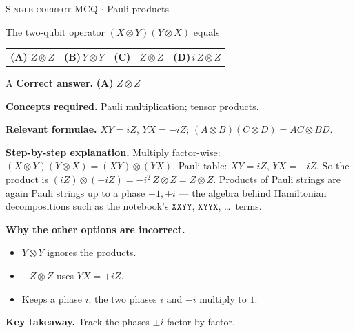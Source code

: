 \documentclass[11pt,a4paper]{article}
\newcommand{\optlabel}[1]{\textbf{(#1)}}
\newcommand{\correctlabel}[1]{\textcolor{okgreen}{\textbf{(#1)}\,\ding{51}}}
\newenvironment{qitem}[1]{\begin{list}{}{\setlength{\leftmargin}{3.3em}\setlength{\labelwidth}{3.1em}%
  \setlength{\labelsep}{0.2em}\setlength{\topsep}{3pt}\setlength{\parsep}{3pt}}\item[\textbf{Q.#1}\hfill]}{\end{list}}
\newcommand{\qsep}{\par\vspace{2pt}{\color{black!15}\hrule}\vspace{4pt}}
\newcommand{\qmeta}[2]{{\footnotesize\color{black!60}\textsc{#1} \;$\cdot$\; #2}\par}
\begin{document}
\begin{qitem}{22}
\qmeta{Single-correct MCQ}{Pauli products}
The two-qubit operator $(X\otimes Y)(Y\otimes X)$ equals
\par\smallskip\noindent\begin{tabularx}{\linewidth}{@{}*{4}{L}@{}}
\correctlabel{A}\,$Z\otimes Z$ & \optlabel{B}\,$Y\otimes Y$ & \optlabel{C}\,$-Z\otimes Z$ & \optlabel{D}\,$i\,Z\otimes Z$
\end{tabularx}
\end{qitem}
\begin{solbox}{A}
\textbf{\color{brand}Correct answer.} \textcolor{okgreen}{\textbf{(A)}} $Z\otimes Z$

\textbf{\color{brand}Concepts required.} Pauli multiplication; tensor products.

\textbf{\color{brand}Relevant formulae.} $XY = iZ$, $YX = -iZ$; $(A\otimes B)(C\otimes D) = AC\otimes BD$.

\textbf{\color{brand}Step-by-step explanation.} Multiply factor-wise: $(X\otimes Y)(Y\otimes X) = (XY)\otimes(YX)$. Pauli table: $XY = iZ$, $YX = -iZ$. So the product is
$(iZ)\otimes(-iZ) = -i^2\,Z\otimes Z = Z\otimes Z$. Products of Pauli strings are again Pauli strings up to a phase $\pm1, \pm i$ --- the
algebra behind Hamiltonian decompositions such as the notebook's $\texttt{XXYY}$, $\texttt{XYYX}$, \dots\ terms.

\textbf{\color{brand}Why the other options are incorrect.}
\begin{itemize}[leftmargin=2.4em, itemsep=1pt, topsep=2pt]
\item[\textbf{(B)}] $Y\otimes Y$ ignores the products.
\item[\textbf{(C)}] $-Z\otimes Z$ uses $YX = +iZ$.
\item[\textbf{(D)}] Keeps a phase $i$; the two phases $i$ and $-i$ multiply to $1$.
\end{itemize}
\textbf{\color{brand}Key takeaway.} Track the phases $\pm i$ factor by factor.
\end{solbox}
\qsep
\end{document}
